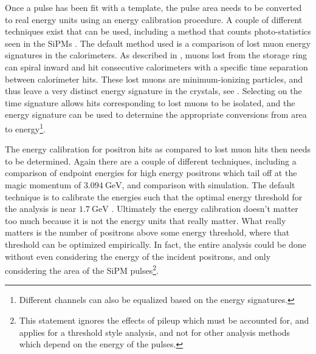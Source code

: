 Once a pulse has been fit with a template, the pulse area needs to be converted to real energy units using an energy calibration procedure. A couple of different techniques exist that can be used, including a method that counts photo-statistics seen in the SiPMs \cite{AFThesis}. The default method used is a comparison of lost muon energy signatures in the calorimeters. As described in , muons lost from the storage ring can spiral inward and hit consecutive calorimeters with a specific time separation between calorimeter hits. These lost muons are minimum-ionizing particles, and thus leave a very distinct energy signature in the crystals, see . Selecting on the time signature allows hits corresponding to lost muons to be isolated, and the energy signature can be used to determine the appropriate conversions from area to energy\footnote{Different channels can also be equalized based on the energy signatures.}. 


The energy calibration for positron hits as compared to lost muon hits then needs to be determined. Again there are a couple of different techniques, including a comparison of endpoint energies for high energy positrons which tail off at the magic momentum of $\SI{3.094}{\GeV}$, and comparison with simulation. The default technique is to calibrate the energies such that the optimal energy threshold for the \wa analysis is near $\SI{1.7}{\GeV}$ \cite{AFThesis}. Ultimately the energy calibration doesn't matter too much because it is not the energy units that really matter. What really matters is the number of positrons above some energy threshold, where that threshold can be optimized empirically. In fact, the entire \wa analysis could be done without even considering the energy of the incident positrons, and only considering the area of the SiPM pulses\footnote{This statement ignores the effects of pileup which must be accounted for, and applies for a threshold style analysis, and not for other analysis methods which depend on the energy of the pulses.}.


